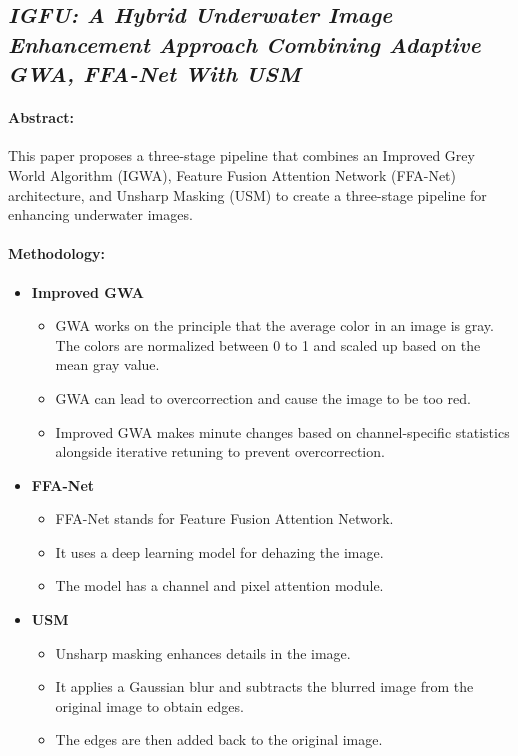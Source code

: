 \subsection{\textit{IGFU: A Hybrid Underwater Image Enhancement Approach Combining Adaptive GWA, FFA-Net With USM\cite{Yuan_2025}}}

\paragraph{Abstract:}
This paper proposes a three-stage pipeline that combines an Improved Grey World Algorithm (IGWA), Feature Fusion Attention Network (FFA-Net) architecture, and Unsharp Masking (USM) to create a three-stage pipeline for enhancing underwater images.

\paragraph{Methodology:}
\begin{itemize}
      \item \textbf{Improved GWA}
            \begin{itemize}
                  \item GWA works on the principle that the average color in an image is gray. The colors are normalized between 0 to 1 and scaled up based on the mean gray value.
                  \item GWA can lead to overcorrection and cause the image to be too red.
                  \item Improved GWA makes minute changes based on channel-specific statistics alongside iterative retuning to prevent overcorrection.
            \end{itemize}

      \item \textbf{FFA-Net}
            \begin{itemize}
                  \item FFA-Net stands for Feature Fusion Attention Network.
                  \item It uses a deep learning model for dehazing the image.
                  \item The model has a channel and pixel attention module.
            \end{itemize}

      \item \textbf{USM}
            \begin{itemize}
                  \item Unsharp masking enhances details in the image.
                  \item It applies a Gaussian blur and subtracts the blurred image from the original image to obtain edges.
                  \item The edges are then added back to the original image.
            \end{itemize}
\end{itemize}

